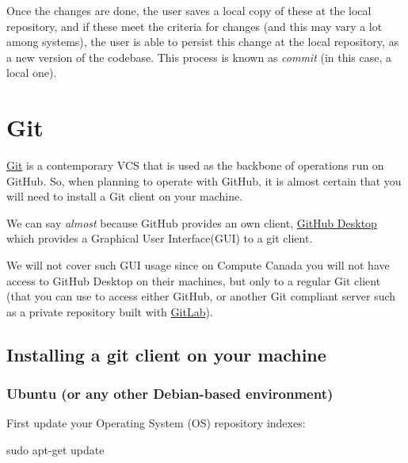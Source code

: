 \documentclass[
]{book}
\newenvironment{Shaded}{\begin{snugshade}}{\end{snugshade}}
\newcommand{\FunctionTok}[1]{\textcolor[rgb]{0.00,0.00,0.00}{#1}}
\newcommand{\NormalTok}[1]{#1}
\begin{document}
Once the changes are done, the user saves a local copy of these at the local repository,
and if these meet the criteria for changes (and this may vary a lot among systems),
the user is able to persist this change at the local repository, as a new version of
the codebase. This process is known as \emph{commit} (in this case, a local one).

\hypertarget{git}{%
\section{Git}\label{git}}

\href{https://git-scm.com/}{Git} is a contemporary VCS that is used as the backbone
of operations run on GitHub. So, when planning to operate with GitHub, it is
almost certain that you will need to install a Git client on your machine.

We can say \emph{almost} because GitHub provides an own client,
\href{https://desktop.github.com/}{GitHub Desktop} which provides a Graphical User
Interface(GUI) to a git client.

We will not cover such GUI usage since on Compute Canada you will not have access
to GitHub Desktop on their machines, but only to
a regular Git client (that you can use to access either GitHub, or another Git
compliant server such as a private repository built with
\href{https://about.gitlab.com/}{GitLab}).

\hypertarget{installing-a-git-client-on-your-machine}{%
\subsection{Installing a git client on your machine}\label{installing-a-git-client-on-your-machine}}

\hypertarget{ubuntu-or-any-other-debian-based-environment}{%
\subsubsection{Ubuntu (or any other Debian-based environment)}\label{ubuntu-or-any-other-debian-based-environment}}

First update your Operating System (OS) repository indexes:

\begin{Shaded}
\begin{Highlighting}[]
\FunctionTok{sudo}\NormalTok{ apt{-}get update}
\end{Highlighting}
\end{Shaded}
\end{document}
